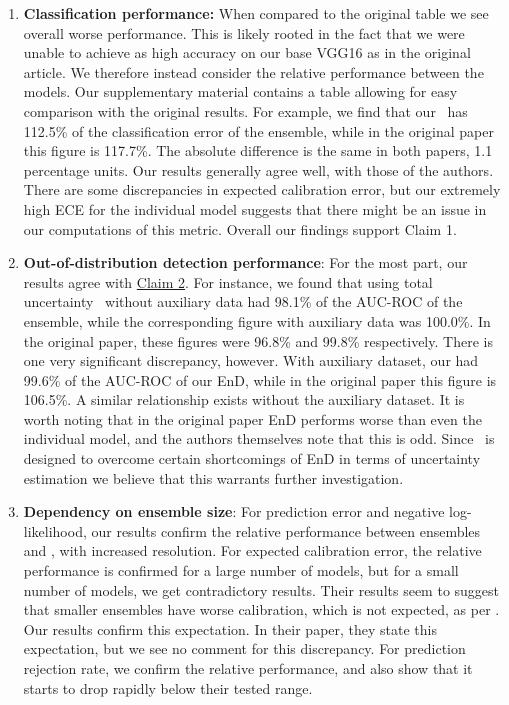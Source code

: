 \begin{enumerate}
    \item \textbf{Classification performance:} When compared to the original table we see overall worse performance. This is likely rooted in the fact that we were unable to achieve as high accuracy on our base VGG16 as in the original article. We therefore instead consider the relative performance between the models. Our supplementary material contains a table allowing for easy comparison with the original results. For example, we find that our \EnDD \ has 112.5\% of the classification error of the ensemble, while in the original paper this figure is 117.7\%. The absolute difference is the same in both papers, 1.1 percentage units. Our results generally agree well, with those of the authors. There are some discrepancies in expected calibration error, but our extremely high ECE for the individual model suggests that there might be an issue in our computations of this metric. Overall our findings support Claim 1. 
    
    \item \textbf{Out-of-distribution detection performance}: For the most part, our results agree with \hyperlink{claim2}{Claim 2}. For instance, we found that using total uncertainty \EnDD \  without auxiliary data had 98.1\% of the AUC-ROC of the ensemble, while the corresponding figure with auxiliary data was 100.0\%. In the original paper, these figures were 96.8\% and 99.8\% respectively. There is one very significant discrepancy, however. With auxiliary dataset, our \EnDD had 99.6\% of the AUC-ROC of our EnD, while in the original paper this figure is 106.5\%. A similar relationship exists without the auxiliary dataset. It is worth noting that in the original paper EnD performs worse than even the individual model, and the authors themselves note that this is odd. Since \EnDD \ is designed to overcome certain shortcomings of EnD in terms of uncertainty estimation we believe that this warrants further investigation.
    
    \item \textbf{Dependency on ensemble size}: For prediction error and negative log-likelihood, our results confirm the relative performance between ensembles and \EnDDaux, with increased resolution. For expected calibration error, the relative performance is confirmed for a large number of models, but for a small number of models, we get contradictory results. Their results seem to suggest that smaller ensembles have worse calibration, which is not expected, as per \cite{Lakshminarayanan2017}. Our results confirm this expectation. In their paper, they state this expectation, but we see no comment for this discrepancy. For prediction rejection rate, we confirm the relative performance, and also show that it starts to drop rapidly below their tested range.
    

\end{enumerate}
